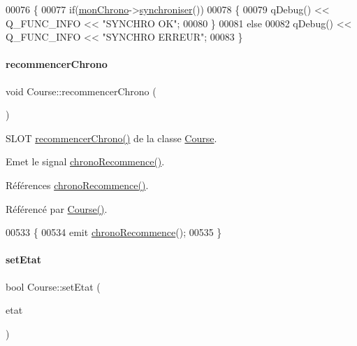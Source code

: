 \begin{DoxyCode}
00076 \{
00077     \textcolor{keywordflow}{if}(\hyperlink{class_course_a0c9b246b0f1ec612bd6e6c613a94d52b}{monChrono}->\hyperlink{class_chrono_a858a209a6d366b3adb95bcf593645d6a}{synchroniser}())
00078     \{
00079         qDebug() << Q\_FUNC\_INFO << \textcolor{stringliteral}{"SYNCHRO OK"};
00080     \}
00081     \textcolor{keywordflow}{else}
00082         qDebug() << Q\_FUNC\_INFO << \textcolor{stringliteral}{"SYNCHRO ERREUR"};
00083 \}
\end{DoxyCode}
\mbox{\label{class_course_addeae907c4bc0a268f51479041de389c}} 
\paragraph{\texorpdfstring{recommencer\+Chrono}{recommencerChrono}}
{\footnotesize\ttfamily void Course\+::recommencer\+Chrono (\begin{DoxyParamCaption}{ }\end{DoxyParamCaption})\hspace{0.3cm}{\ttfamily [slot]}}



S\+L\+OT \hyperlink{class_course_addeae907c4bc0a268f51479041de389c}{recommencer\+Chrono()} de la classe \hyperlink{class_course}{Course}. 

Emet le signal \hyperlink{class_course_a178f2015d20ef5d838564671567f6831}{chrono\+Recommence()}. 

Références \hyperlink{class_course_a178f2015d20ef5d838564671567f6831}{chrono\+Recommence()}.



Référencé par \hyperlink{class_course_af6317ecab95f8a2eb205b4f91b530992}{Course()}.


\begin{DoxyCode}
00533 \{
00534     emit \hyperlink{class_course_a178f2015d20ef5d838564671567f6831}{chronoRecommence}();
00535 \}
\end{DoxyCode}
\mbox{\label{class_course_a3ebcde1fa443cb20d71fb98af4d0c418}} 
\paragraph{\texorpdfstring{set\+Etat}{setEtat}}
{\footnotesize\ttfamily bool Course\+::set\+Etat (\begin{DoxyParamCaption}\item[{Q\+String}]{etat }\end{DoxyParamCaption})\hspace{0.3cm}{\ttfamily [slot]}}



